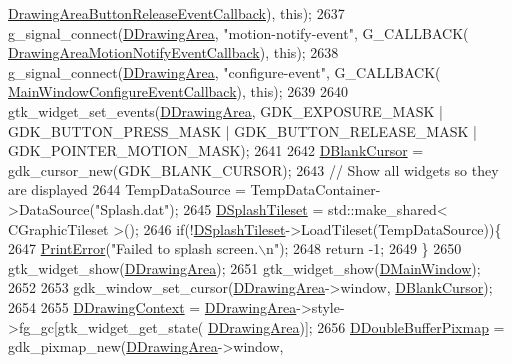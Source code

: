 \begin{DoxyCode}
      \hyperlink{classCApplicationData_a2708d2083c8c2e7c8de126b40eb17b3f}{DrawingAreaButtonReleaseEventCallback}), \textcolor{keyword}{this});
2637     g\_signal\_connect(\hyperlink{classCApplicationData_a4735f5d31632313e0b2a1659eb178987}{DDrawingArea}, \textcolor{stringliteral}{"motion-notify-event"}, G\_CALLBACK(
      \hyperlink{classCApplicationData_a463a4bc8eabe67f9f22c46d96f5eff88}{DrawingAreaMotionNotifyEventCallback}), \textcolor{keyword}{this});
2638     g\_signal\_connect(\hyperlink{classCApplicationData_a4735f5d31632313e0b2a1659eb178987}{DDrawingArea}, \textcolor{stringliteral}{"configure-event"}, G\_CALLBACK(
      \hyperlink{classCApplicationData_a31b48405b43d73cabca4c080c1b9beee}{MainWindowConfigureEventCallback}), \textcolor{keyword}{this});
2639     
2640     gtk\_widget\_set\_events(\hyperlink{classCApplicationData_a4735f5d31632313e0b2a1659eb178987}{DDrawingArea}, GDK\_EXPOSURE\_MASK | GDK\_BUTTON\_PRESS\_MASK | 
      GDK\_BUTTON\_RELEASE\_MASK | GDK\_POINTER\_MOTION\_MASK);
2641     
2642     \hyperlink{classCApplicationData_a34b9a8bb2c85704fb4bd07209acdcdc4}{DBlankCursor} = gdk\_cursor\_new(GDK\_BLANK\_CURSOR);
2643     \textcolor{comment}{// Show all widgets so they are displayed}
2644     TempDataSource = TempDataContainer->DataSource(\textcolor{stringliteral}{"Splash.dat"});
2645     \hyperlink{classCApplicationData_aea23915b726e1a5aa68a309109679ae1}{DSplashTileset} = std::make\_shared< CGraphicTileset >();
2646     \textcolor{keywordflow}{if}(!\hyperlink{classCApplicationData_aea23915b726e1a5aa68a309109679ae1}{DSplashTileset}->LoadTileset(TempDataSource))\{
2647         \hyperlink{Debug_8h_a2ed825eefefe35baf59a93a8c641323d}{PrintError}(\textcolor{stringliteral}{"Failed to splash screen.\(\backslash\)n"});
2648         \textcolor{keywordflow}{return} -1;
2649     \}
2650     gtk\_widget\_show(\hyperlink{classCApplicationData_a4735f5d31632313e0b2a1659eb178987}{DDrawingArea});           
2651     gtk\_widget\_show(\hyperlink{classCApplicationData_af3c57a84b4ecca8a7f86b67a0ae55372}{DMainWindow});
2652     
2653     gdk\_window\_set\_cursor(\hyperlink{classCApplicationData_a4735f5d31632313e0b2a1659eb178987}{DDrawingArea}->window, \hyperlink{classCApplicationData_a34b9a8bb2c85704fb4bd07209acdcdc4}{DBlankCursor}); 
2654     
2655     \hyperlink{classCApplicationData_aa6c5bea9bdcc64398e5a3f693661d37c}{DDrawingContext} = \hyperlink{classCApplicationData_a4735f5d31632313e0b2a1659eb178987}{DDrawingArea}->style->fg\_gc[gtk\_widget\_get\_state(
      \hyperlink{classCApplicationData_a4735f5d31632313e0b2a1659eb178987}{DDrawingArea})];
2656     \hyperlink{classCApplicationData_aefb64ec5ca3f791f6d431cfc56b9f3b3}{DDoubleBufferPixmap} = gdk\_pixmap\_new(\hyperlink{classCApplicationData_a4735f5d31632313e0b2a1659eb178987}{DDrawingArea}->window, 

\end{DoxyCode}
